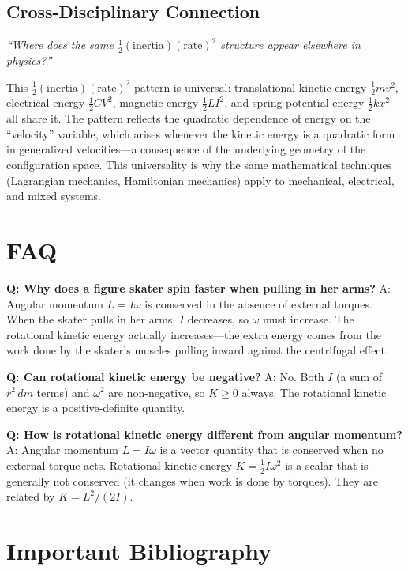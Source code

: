 \documentclass[11pt,openright]{book}
\begin{document}
\subsection*{Cross-Disciplinary Connection}
\textit{``Where does the same $\frac{1}{2}(\text{inertia})(\text{rate})^2$ structure appear elsewhere in physics?''}

This $\frac{1}{2}(\text{inertia})(\text{rate})^2$ pattern is universal: translational kinetic energy $\frac{1}{2}mv^2$, electrical energy $\frac{1}{2}CV^2$, magnetic energy $\frac{1}{2}LI^2$, and spring potential energy $\frac{1}{2}kx^2$ all share it. The pattern reflects the quadratic dependence of energy on the ``velocity'' variable, which arises whenever the kinetic energy is a quadratic form in generalized velocities---a consequence of the underlying geometry of the configuration space. This universality is why the same mathematical techniques (Lagrangian mechanics, Hamiltonian mechanics) apply to mechanical, electrical, and mixed systems.

\section*{FAQ}

\textbf{Q: Why does a figure skater spin faster when pulling in her arms?}
A: Angular momentum $L = I\omega$ is conserved in the absence of external torques. When the skater pulls in her arms, $I$ decreases, so $\omega$ must increase. The rotational kinetic energy actually increases---the extra energy comes from the work done by the skater's muscles pulling inward against the centrifugal effect.

\textbf{Q: Can rotational kinetic energy be negative?}
A: No. Both $I$ (a sum of $r^2\,dm$ terms) and $\omega^2$ are non-negative, so $K \geq 0$ always. The rotational kinetic energy is a positive-definite quantity.

\textbf{Q: How is rotational kinetic energy different from angular momentum?}
A: Angular momentum $L = I\omega$ is a vector quantity that is conserved when no external torque acts. Rotational kinetic energy $K = \frac{1}{2}I\omega^2$ is a scalar that is generally not conserved (it changes when work is done by torques). They are related by $K = L^2/(2I)$.
\section*{Important Bibliography}
\end{document}
